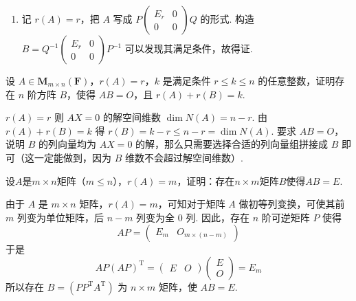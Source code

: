 \begin{exercise}
\begin{exgroup}
\begin{answer}
\begin{enumerate}
                \item 记 $r(A)=r$，把 $A$ 写成 $P\begin{pmatrix}E_r & 0 \\ 0 & 0\end{pmatrix}Q$ 的形式. 构造 $B=Q^{-1}\begin{pmatrix}E_r & 0 \\ 0 & 0\end{pmatrix}P^{-1}$ 可以发现其满足条件，故得证.
            \end{enumerate}
        \end{answer}

        \item 设 $A \in \mathbf{M}_{m \times n}(\mathbf{F})$，$r(A)=r$，$k$ 是满足条件 $r \leqslant k \leqslant n$ 的任意整数，证明存在 $n$ 阶方阵 $B$，使得 $AB=O$，且 $r(A)+r(B)=k$.
        \begin{answer}
            $r(A)=r$ 则 $AX=0$ 的解空间维数 $\dim N(A) = n-r$. 由 $r(A)+r(B)=k$ 得 $r(B)=k-r \leqslant n-r=\dim N(A)$. 要求 $AB=O$，说明 $B$ 的列向量均为 $AX=0$ 的解，那么只需要选择合适的列向量组拼接成 $B$ 即可（这一定能做到，因为 $B$ 维数不会超过解空间维数）.
        \end{answer}

        \item 设$A$是$m \times n$矩阵（$m \leqslant n$），$r(A)=m$，证明：存在$n \times m$矩阵$B$使得$AB=E$.
        \begin{answer}
            由于 $A$ 是 $m\times n$ 矩阵，$r(A)=m$，可知对于矩阵 $A$ 做初等列变换，可使其前 $m$ 列变为单位矩阵，后 $n-m$ 列变为全 0 列. 因此，存在 $n$ 阶可逆矩阵 $P$ 使得
          \[AP=\begin{pmatrix}E_m & O_{m\times (n-m)}\end{pmatrix}\]
          于是\[AP(AP)^{\mathrm{T}} = \begin{pmatrix}E & O\end{pmatrix} \begin{pmatrix}E \\ O\end{pmatrix}=E_m\]
          所以存在 $B=(PP^{\mathrm{T}}A^{\mathrm{T}})$ 为 $n\times m$ 矩阵，使 $AB=E$.
        \end{answer}


\end{exgroup}
\end{exercise}
